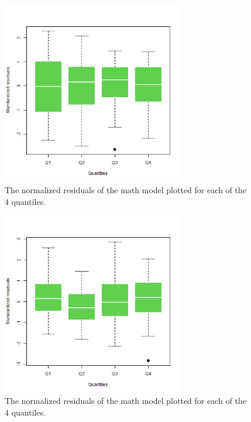 \documentclass[10pt, a4paper]{article}
\begin{document}
	\begin{figure}
		\includegraphics[width=8cm]{lm_socst_nopeeking_residual_boxplot.png}
		\centering
		\caption{The normalized residuals of the math model plotted for each of the 4 quantiles. }
		\label{fig::lm_socst_nopeeking_boxplot}
	\end{figure}

	\begin{figure}
		\includegraphics[width=8cm]{lm_math_binary_residual_boxplot.png}
		\centering
		\caption{The normalized residuals of the math model plotted for each of the 4 quantiles.}
		\label{fig::lm_cut_math_boxplot}
	\end{figure}
\end{document}
